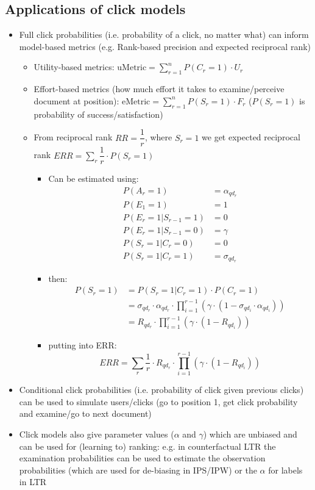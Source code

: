 \subsection{Applications of click models}
\begin{itemize}
	\item Full click probabilities (i.e. probability of a click, no matter what) can inform model-based metrics (e.g. Rank-based precision and expected reciprocal rank)
	\begin{itemize}
		\item Utility-based metrics: $\mathrm{uMetric} = \sum_{r=1}^n P(C_r = 1) \cdot U_r$
		\item Effort-based metrics (how much effort it takes to examine/perceive document at position): $\mathrm{eMetric} = \sum_{r=1}^n P(S_r = 1) \cdot F_r$ ($P(S_r = 1)$ is probability of success/satisfaction)
		\item From reciprocal rank $RR = \dfrac{1}{r}$, where $S_r =1$ we get expected reciprocal rank $ERR = \sum_r \dfrac{1}{r} \cdot P(S_r =1)$
		\begin{itemize}
			\item Can be estimated using:
			\begin{align*}
				P(A_r = 1) &= \alpha_{qd_r} \\
				P(E_1 = 1 ) &= 1 \\
				P(E_r =1 | S_{r-1} = 1) &= 0 \\
				P(E_r =1 | S_{r-1} = 0) &= \gamma \\
				P(S_r = 1 | C_r = 0) &= 0 \\
				P(S_r = 1 | C_r = 1) &= \sigma_{qd_r}
			\end{align*}
			\item then:
			\begin{align*}
				P(S_r=1) &= P(S_r = 1 | C_r = 1) \cdot P(C_r = 1) \\
				&= \sigma_{qd_r} \cdot \alpha_{qd_r} \cdot \prod_{i=1}^{r-1} (\gamma \cdot (1 - \sigma_{qd_i} \cdot \alpha_{qd_i})) \\
				&= R_{qd_r} \cdot \prod_{i=1}^{r-1} (\gamma \cdot (1 - R_{qd_i}))
			\end{align*}
			\item putting into ERR:
			$$ ERR = \sum_r \dfrac{1}{r} \cdot R_{qd_r} \cdot \prod_{i=1}^{r-1} (\gamma \cdot (1 - R_{qd_i})) $$
		\end{itemize}
	\end{itemize}
	\item Conditional click probabilities (i.e. probability of click given previous clicks) can be used to simulate users/clicks (go to position 1, get click probability and examine/go to next document)
	\item Click models also give parameter values ($\alpha$ and $\gamma$) which are unbiased and can be used for (learning to) ranking: e.g. in counterfactual LTR the examination probabilities can be used to estimate the observation probabilities (which are used for de-biasing in IPS/IPW) or the $\alpha$ for labels in LTR
\end{itemize}